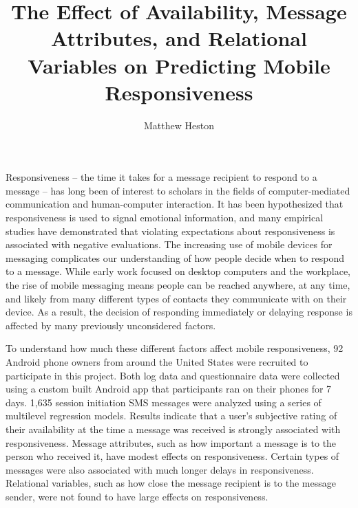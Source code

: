 \documentclass[12pt]{nuthesis}	%
\author{Matthew Heston}
\title{The Effect of Availability, Message Attributes, and Relational Variables on Predicting Mobile Responsiveness}
\begin{document}
%	
%


\frontmatter		%

\maketitle		%

\copyrightpage		%


\abstract		%

Responsiveness -- the time it takes for a message recipient to respond to a message -- has long been of interest to scholars in the fields of computer-mediated communication and human-computer interaction. It has been hypothesized that responsiveness is used to signal emotional information, and many empirical studies have demonstrated that violating expectations about responsiveness is associated with negative evaluations. The increasing use of mobile devices for messaging complicates our understanding of how people decide when to respond to a message. While early work focused on desktop computers and the workplace, the rise of mobile messaging means people can be reached anywhere, at any time, and likely from many different types of contacts they communicate with on their device. As a result, the decision of responding immediately or delaying response is affected by many previously unconsidered factors.

To understand how much these different factors affect mobile responsiveness, 92 Android phone owners from around the United States were recruited to participate in this project. Both log data and questionnaire data were collected using a custom built Android app that participants ran on their phones for 7 days. 1,635 session initiation SMS messages were analyzed using a series of multilevel regression models. Results indicate that a user's subjective rating of their availability at the time a message was received is strongly associated with responsiveness. Message attributes, such as how important a message is to the person who received it, have modest effects on responsiveness. Certain types of messages were also associated with much longer delays in responsiveness. Relational variables, such as how close the message recipient is to the message sender, were not found to have large effects on responsiveness. 

\acknowledgements	%
\end{document}
